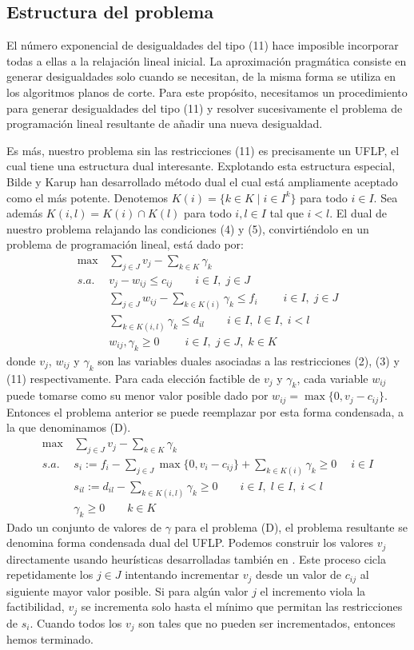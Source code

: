 \documentclass[twoside,12pt]{article}
\begin{document}
\subsection{Estructura del problema}
El número exponencial de desigualdades del tipo (11) hace imposible incorporar todas a ellas a la relajación lineal inicial. La aproximación pragmática consiste en generar desigualdades solo cuando se necesitan, de la misma forma se utiliza en los algoritmos planos de corte. Para este propósito, necesitamos un procedimiento para generar desigualdades del tipo (11) y resolver sucesivamente el problema de programación lineal resultante de añadir una nueva desigualdad.

Es más, nuestro problema sin las restricciones (11) es precisamente un UFLP, el cual tiene una estructura dual interesante. Explotando esta estructura especial, Bilde y Karup \cite{bilde} han desarrollado método dual el cual está ampliamente aceptado como el más potente. Denotemos $K(i) = \{k \in K \mid i \in I^k\}$ para todo $i\in I$. Sea además $K(i,l) = K(i)\cap K(l)$ para todo $i,l \in I$ tal que $i<l$. El dual de nuestro problema relajando las condiciones (4) y (5), convirtiéndolo en un problema de programación lineal, está dado por:
\begin{align*}
\max \,& \sum_{j\in J} v_j - \sum_{k\in K} \gamma_k \\
s.a.\,& v_j - w_{ij} \leq c_{ij} \qquad  i\in I,\;j \in J\\
& \sum_{j\in J} w_{ij} - \sum_{k\in K(i)} \gamma_k \leq f_i \;\qquad i \in I,\; j\in J\\
&\sum_{k\in K(i,l)} \gamma_k \leq d_{il} \qquad i \in I,\; l\in I,\; i<l\\
&w_{ij},\gamma_k \geq 0 \qquad \;i\in I,\; j\in J,\; k\in K
\end{align*}
donde $v_j$, $w_{ij}$ y $\gamma_k$ son las variables duales asociadas a las restricciones (2), (3) y (11) respectivamente. Para cada elección factible de $v_j$ y $\gamma_k$, cada variable $w_{ij}$ puede tomarse como su menor valor posible dado por $w_{ij} = \max\{0,v_j-c_{ij}\}$. Entonces el problema anterior se puede reemplazar por esta forma condensada, a la que denominamos (D).
 \begin{align*}
\max \,& \sum_{j\in J} v_j - \sum_{k\in K} \gamma_k \\
s.a.\,& s_i:= f_i -\sum_{j \in J} \max\{0,v_i-c_{ij}\} + \sum_{k \in K(i)} \gamma_k \geq 0 \;\quad  i \in I \\
& s_{il}:= d_{il} - \sum_{k\in K(i,l)} \gamma_k \geq 0 \qquad i \in I,\; l\in I,\; i<l\\
&\gamma_k \geq 0 \qquad  k\in K
\end{align*}
Dado un conjunto de valores de $\gamma$ para el problema (D), el problema resultante se denomina forma condensada dual del UFLP. Podemos construir los valores $v_j$ directamente usando heurísticas desarrolladas también en \cite{bilde}. Este proceso cicla repetidamente los $j\in J$ intentando incrementar $v_j$ desde un valor de $c_{ij}$ al siguiente mayor valor posible. Si para algún valor $j$ el incremento viola la factibilidad, $v_j$ se incrementa solo hasta el mínimo que permitan las restricciones de $s_i$. Cuando todos los $v_j$ son tales que no pueden ser incrementados, entonces hemos terminado.
\newpage
\end{document}
